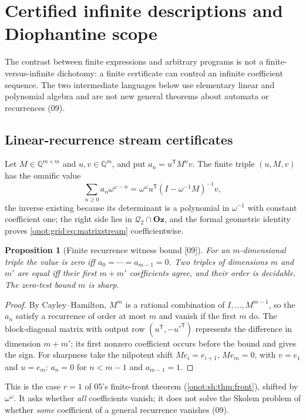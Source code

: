 \documentclass[11pt,oneside]{article}
\numberwithin{equation}{section}
\newtheorem{proposition}[proposition]{Proposition}
\theoremstyle{definition}
\theoremstyle{remark}
\newcommand{\Oz}{\mathbf{Oz}}
\newcommand{\Q}{\mathbb Q}
\newcommand{\QO}{\mathcal Q}
\newcommand{\src}[1]{\textup{\textsf{\small[#1]}}}
\begin{document}
\section{Certified infinite descriptions and Diophantine scope}\label{onot:grid:sec:certificates}

The contrast between finite expressions and arbitrary programs is not a
finite-versus-infinite dichotomy: a finite certificate can control an infinite
coefficient sequence. The two intermediate languages below use elementary linear
and polynomial algebra and are not new general theorems about automata or
recurrences (09).

\subsection{Linear-recurrence stream certificates}

Let $M\in\Q^{m\times m}$ and $u,v\in\Q^m$, and put $a_n=u^{\mathsf T}M^nv$. The
finite triple $(u,M,v)$ has the omnific value
\begin{equation}\label{onot:grid:eq:matrixstream}
 \sum_{n\ge0}a_n\omega^{\omega-n}=\omega^\omega u^{\mathsf T}(I-\omega^{-1}M)^{-1}v,
\end{equation}
the inverse existing because its determinant is a polynomial in $\omega^{-1}$
with constant coefficient one; the right side lies in $\QO_2\cap\Oz$, and the
formal geometric identity proves \eqref{onot:grid:eq:matrixstream}
coefficientwise.

\begin{proposition}[Finite recurrence witness bound \src{09}]\label{onot:grid:prop:recurrence}
For an $m$-dimensional triple the value is zero iff $a_0=\cdots=a_{m-1}=0$. Two
triples of dimensions $m$ and $m'$ are equal iff their first $m+m'$ coefficients
agree, and their order is decidable. The zero-test bound $m$ is sharp.
\end{proposition}
\begin{proof}
By Cayley--Hamilton, $M^m$ is a rational combination of $I,\ldots,M^{m-1}$, so the
$a_n$ satisfy a recurrence of order at most $m$ and vanish if the first $m$ do. The
block-diagonal matrix with output row $(u^{\mathsf T},-u'^{\mathsf T})$ represents
the difference in dimension $m+m'$; its first nonzero coefficient occurs before the
bound and gives the sign. For sharpness take the nilpotent shift $Me_i=e_{i+1}$,
$Me_m=0$, with $v=e_1$ and $u=e_m$: $a_n=0$ for $n<m-1$ and $a_{m-1}=1$.
\end{proof}
This is the case $r=1$ of 05's finite-front theorem
(\cref{onot:sh:thm:front}), shifted by $\omega^\omega$. It asks whether \emph{all}
coefficients vanish; it does not solve the Skolem problem of whether \emph{some}
coefficient of a general recurrence vanishes (09).
\end{document}
